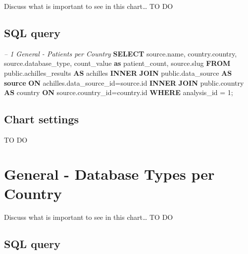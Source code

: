 \documentclass[]{book}
\newenvironment{Shaded}{\begin{snugshade}}{\end{snugshade}}
\newcommand{\KeywordTok}[1]{\textcolor[rgb]{0.13,0.29,0.53}{\textbf{#1}}}
\newcommand{\DecValTok}[1]{\textcolor[rgb]{0.00,0.00,0.81}{#1}}
\newcommand{\CommentTok}[1]{\textcolor[rgb]{0.56,0.35,0.01}{\textit{#1}}}
\newcommand{\NormalTok}[1]{#1}
\begin{document}
Discuss what is important to see in this chart\ldots{} TO DO

\subsection{SQL query}\label{sql-query-5}

\begin{Shaded}
\begin{Highlighting}[]
\CommentTok{-- 1    General - Patients per Country}
\KeywordTok{SELECT}\NormalTok{ source.name,}
\NormalTok{       country.country,}
\NormalTok{       source.database_type,}
\NormalTok{       count_value }\KeywordTok{as}\NormalTok{ patient_count,}
\NormalTok{       source.slug}
\KeywordTok{FROM}\NormalTok{ public.achilles_results }\KeywordTok{AS}\NormalTok{ achilles }\KeywordTok{INNER} \KeywordTok{JOIN} 
\NormalTok{  public.data_source }\KeywordTok{AS} \KeywordTok{source} \KeywordTok{ON}\NormalTok{ achilles.data_source_id=source.id}
  \KeywordTok{INNER} \KeywordTok{JOIN}\NormalTok{ public.country }\KeywordTok{AS}\NormalTok{ country }\KeywordTok{ON} 
\NormalTok{  source.country_id=country.id}
\KeywordTok{WHERE}\NormalTok{ analysis_id = }\DecValTok{1}\NormalTok{;}
\end{Highlighting}
\end{Shaded}

\subsection{Chart settings}\label{chart-settings-5}

TO DO

\section{General - Database Types per
Country}\label{general---database-types-per-country}

Discuss what is important to see in this chart\ldots{} TO DO

\subsection{SQL query}\label{sql-query-6}
\end{document}
